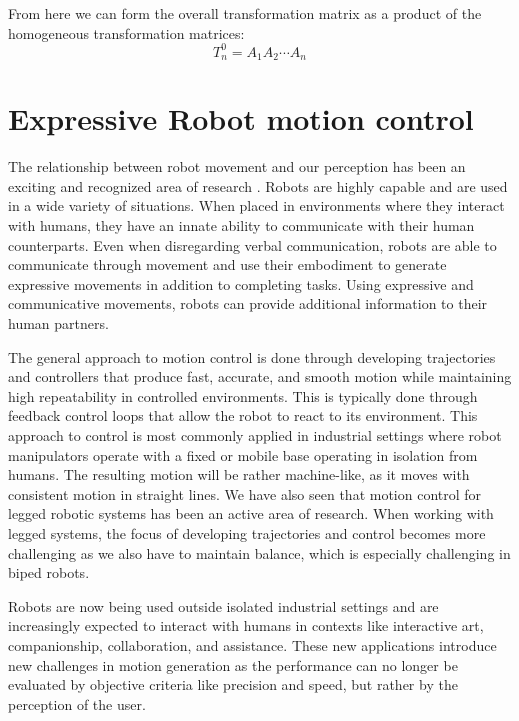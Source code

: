From here we can form the overall transformation matrix as a product of the homogeneous transformation matrices:
\begin{equation}
   T_n^0 = A_1 A_2 \cdots A_n
\label{placeholder}
\end{equation}


\section{Expressive Robot motion control}
The relationship between robot movement and our perception has been an exciting and recognized area of research \cite{van_den_brule_robot_2014}. Robots are highly capable and are used in a wide variety of situations. When placed in environments where they interact with humans, they have an innate ability to communicate with their human counterparts. Even when disregarding verbal communication, robots are able to communicate through movement and use their embodiment to generate expressive movements in addition to completing tasks. Using expressive and communicative movements, robots can provide additional information to their human partners.

The general approach to motion control is done through developing trajectories and controllers that produce fast, accurate, and smooth motion while maintaining high repeatability in controlled environments. This is typically done through feedback control loops that allow the robot to react to its environment.  This approach to control is most commonly applied in industrial settings where robot manipulators operate with a fixed or mobile base operating in isolation from humans. The resulting motion will be rather machine-like, as it moves with consistent motion in straight lines. We have also seen that motion control for legged robotic systems has been an active area of research\cite{wieber_modeling_2016}. When working with legged systems, the focus of developing trajectories and control becomes more challenging as we also have to maintain balance, which is especially challenging in biped robots.

Robots are now being used outside isolated industrial settings and are increasingly expected to interact with humans in contexts like interactive art, companionship, collaboration, and assistance. These new applications introduce new challenges in motion generation as the performance can no longer be evaluated by objective criteria like precision and speed, but rather by the perception of the user.

